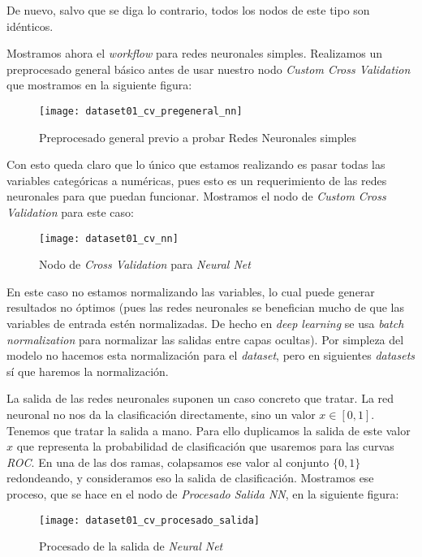 \documentclass[11pt]{article}
\begin{document}
De nuevo, salvo que se diga lo contrario, todos los nodos de este tipo son idénticos.

Mostramos ahora el \emph{workflow} para redes neuronales simples. Realizamos un preprocesado general básico antes de usar nuestro nodo \emph{Custom Cross Validation} que mostramos en la siguiente figura:

\begin{figure}[H]
    \centering
    \texttt{[image: dataset01\_cv\_pregeneral\_nn]}
    \caption{Preprocesado general previo a probar Redes Neuronales simples}
\end{figure}

Con esto queda claro que lo único que estamos realizando es pasar todas las variables categóricas a numéricas, pues esto es un requerimiento de las redes neuronales para que puedan funcionar. Mostramos el nodo de \emph{Custom Cross Validation} para este caso:

\begin{figure}[H]
    \centering
    \texttt{[image: dataset01\_cv\_nn]}
    \caption{Nodo de \emph{Cross Validation} para \emph{Neural Net}}
\end{figure}

En este caso no estamos normalizando las variables, lo cual puede generar resultados no óptimos (pues las redes neuronales se benefician mucho de que las variables de entrada estén normalizadas. De hecho en \emph{deep learning} se usa \emph{batch normalization} para normalizar las salidas entre capas ocultas). Por simpleza del modelo no hacemos esta normalización para el \emph{dataset}, pero en siguientes \emph{datasets} sí que haremos la normalización.

La salida de las redes neuronales suponen un caso concreto que tratar. La red neuronal no nos da la clasificación directamente, sino un valor $x \in [0, 1]$. Tenemos que tratar la salida a mano. Para ello duplicamos la salida de este valor $x$ que representa la probabilidad de clasificación que usaremos para las curvas \emph{ROC}. En una de las dos ramas, colapsamos ese valor al conjunto $\{0, 1 \}$ redondeando, y consideramos eso la salida de clasificación. Mostramos ese proceso, que se hace en el nodo de \emph{Procesado Salida NN}, en la siguiente figura:

\begin{figure}[H]
    \centering
    \texttt{[image: dataset01\_cv\_procesado\_salida]}
    \caption{Procesado de la salida de \emph{Neural Net}}
\end{figure}
\end{document}
